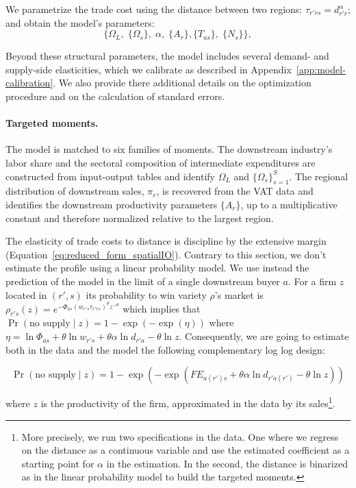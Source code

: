 We parametrize the trade cost using the distance between two regions: $\tau_{r'rs}=d_{r'r}^{\alpha}$; and obtain the model's parameters:
\begin{equation}
\big\{\Omega_{L},\;\{\Omega_{s}\},\;\alpha,\;\{A_{r}\},
\{T_{as}\},\;\{N_{s}\}\big\},
\end{equation}

Beyond these structural parameters, the model includes several demand- and supply-side elasticities, which we calibrate as described in Appendix~\ref{app:model-calibration}. We also provide there additional details on the optimization procedure and on the calculation of standard errors. 


\paragraph{Targeted moments.} The model is matched to six families of moments. The downstream industry's labor share and the sectoral composition of intermediate expenditures are constructed from input-output tables and identify $\Omega_{L}$ and $\{\Omega_{s}\}_{s=1}^{S}$. The regional distribution of downstream sales, $\pi_{r}$, is recovered from the VAT data and identifies the downstream productivity parameters $\{A_{r}\}$, up to a multiplicative constant and therefore normalized relative to the largest region.

The elasticity of trade costs to distance is discipline by the extensive margin (Equation~\eqref{eq:reduced_form_spatialIO}). Contrary to this section, we don't estimate the profile using a linear probability model. We use instead the prediction of the model in the limit of a single downstream buyer $a$. For a firm $z$ located in $(r',s)$ its probability to win variety $\rho$'s market is $\rho_{r's}(z) = e^{-\Phi_{as}(w_{r's}\tau_{r'rs})^{\theta}z^{-\theta}}$ which implies that $\Pr(\text{no supply} \mid z) = 1 - \exp(-\exp(\eta))$ where $\eta = \ln \Phi_{as} + \theta \ln w_{r's} + \theta \alpha \ln d_{r'a} - \theta \ln z$. Consequently, we are going to estimate both in the data and the model the following complementary log log design:

\begin{equation}\label{eq:firm-cloglog}
\Pr(\text{no supply} \mid z) = 1 - \exp(-\exp(FE_{a(r')s} + \theta \alpha \ln d_{r'a(r')} - \theta \ln z))  
\end{equation}



where $z$ is the productivity of the firm, approximated in the data by its sales\footnote{More precisely, we run two specifications in the data. One where we regress on the distance as a continuous variable and use the estimated coefficient as a starting point for $\alpha$ in the estimation. In the second, the distance is binarized as in the linear probability model to build the targeted moments.}. 

